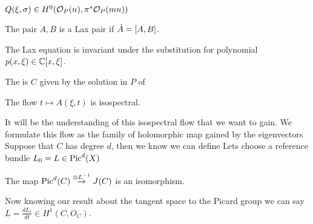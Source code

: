 \documentclass{article}
\begin{document}
\begin{lemma}
	$Q(\xi,\sigma) \in H^0(\mc{O}_P(n), \pi^\ast \mc{O}_P(mn))$
\end{lemma}

\begin{definition}
	The pair $A,B$ is a Lax pair if $\dot{A} = \comm[A]{B}$. 
\end{definition}

\begin{prop}
	The Lax equation is invariant under the substitution 
for polynomial $p(x,\xi) \in \mbb{C}[x,\xi]$. 
\end{prop}

\begin{definition}
	The  is $C$ given by the solution in $P$ of 
\end{definition}

\begin{prop}
	The flow $t \mapsto A(\xi,t)$ is isospectral.
\end{prop}

It will be the understanding of this isospectral flow that we want to gain. We formulate this flow as the family of holomorphic map gained by the eigenvectors 
Suppose that $C$ has degree $d$, then we know we can define 
Lets choose a reference bundle $L_0 =L\in \Pic^d(X)$ 
\begin{lemma}
	The map $\Pic^d(C) \overset{\otimes L^{-1}}{\to} J(C) $ is an isomorphism. 
\end{lemma}
Now knowing our result about the tangent space to the Picard group we can say $\dot{L} = \frac{dL_t}{dt} \in H^1(C,O_C)$. 

\end{document}
